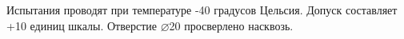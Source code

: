 Испытания проводят при температуре -40 градусов Цельсия. %
Допуск составляет +10 единиц шкалы. %
Отверстие ⌀20 просверлено насквозь. %
